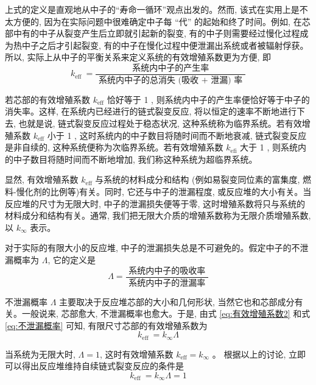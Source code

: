 \documentclass{Sichuan Normal University}
\begin{document}
上式的定义是直观地从中子的“寿命一循环”观点出发的。然而, 该式在实用上是不太方便的, 因为在实际问题中很难确定中子每 “代” 的起始和终了时间。例如, 在芯部中有的中子从裂变产生后立即就引起新的裂变, 有的中子则需要经过慢化过程成为热中子之后才引起裂变, 有的中子在慢化过程中便泄漏出系统或者被辐射俘获。所以, 实际上从中子的平衡关系来定义系统的有效增殖系数更为方便, 即
\begin{equation}
    k_{\text {eff }}=\frac{\text { 系统内中子的产生率 }}{\text { 系统内中子的总消失 (吸收 }+ \text { 泄漏) 率 }}
    \label{eq:有效增殖系数2}
\end{equation}

若芯部的有效增殖系数 $k_{\mathrm{eff}}$ 恰好等于 1 , 则系统内中子的产生率便恰好等于中子的消失率。这样, 在系统内已经进行的链式裂变反应, 将以恒定的速率不断地进行下去, 也就是说, 链式裂变反应过程处于稳态状况, 这种系统称为临界系统。若有效增殖系数 $k_{\mathrm{eff}}$ 小于 1 , 这时系统内的中子数目将随时间而不断地衰减, 链式裂变反应是非自续的, 这种系统便称为次临界系统。若有效增殖系数 $k_{\mathrm{efi}}$ 大于 1 , 则系统内的中子数目将随时间而不断地增加, 我们称这种系统为超临界系统。

显然, 有效增殖系数 $k_{\mathrm{eff}}$ 与系统的材料成分和结构 (例如易裂变同位素的富集度, 燃料-慢化剂的比例等)有关。同时, 它还与中子的泄漏程度, 或反应堆的大小有关。当反应堆的尺寸为无限大时, 中子的泄漏损失便等于零, 这时增殖系数将只与系统的材料成分和结构有关。通常, 我们把无限大介质的增殖系数称为无限介质增殖系数, 以 $k_{\infty}$ 表示。

对于实际的有限大小的反应堆, 中子的泄漏损失总是不可避免的。假定中子的不泄漏概率为 $\Lambda$, 它的定义是
\begin{equation}
    \Lambda=\frac{\text { 系统内中子的吸收率 }}{\text { 系统内中子的泄漏率 }}
    \label{eq:不泄漏概率}
\end{equation}

不泄漏概率 $\Lambda$ 主要取决于反应堆芯部的大小和几何形状, 当然它也和芯部成分有关。一般说来, 芯部愈大, 不泄漏概率也愈大。于是, 由式 \eqref{eq:有效增殖系数2} 和式 \eqref{eq:不泄漏概率} 可知, 有限尺寸芯部的有效增殖系数为
\begin{equation}
    k_{\text {eff }}=k_{\infty} \Lambda
    \label{eq:有效增殖系数3}
\end{equation}

当系统为无限大时, $\Lambda=1$, 这时有效增殖系数 $k_{\mathrm{eff}}=k_{\infty}$ 。
根据以上的讨论, 立即可以得出反应堆维持自续链式裂变反应的条件是
\begin{equation}
    k_{\text {eff }}=k_{\infty} \Lambda=1
    \label{eq:反应堆维持自续链式裂变反应的条件}
\end{equation}
\end{document}
